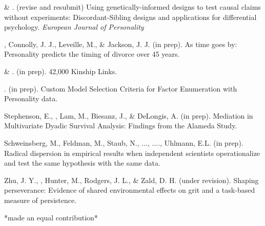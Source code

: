 
\item \meb \& \joe. (revise and resubmit) Using genetically-informed designs to test causal claims without experiments: Discordant-Sibling designs and applications for differential psychology. \textit{European Journal of Personality}  \href{https://osf.io/zpdwt/}{\color{blue}{https://osf.io/zpdwt/}}
\item\meb, Connolly, J. J., Leveille, M., \& Jackson, J. J. (in prep). As time goes by: Personality predicts the timing of divorce over 45 years.%
\item \meb \& \joe.  (in prep). 42,000 Kinship Links.
\item \meb. (in prep). Custom Model Selection Criteria for Factor Enumeration with Personality data.
\item Stephenson, E., \meb, Lam, M., Biesanz, J., \& DeLongis, A. (in prep). Mediation in Multivariate Dyadic Survival Analysis: Findings from the Alameda Study. %
\item Schweinsberg, M., Feldman, M., Staub, N., ..., \meb ...., Uhlmann, E.L. (in prep). Radical dispersion in empirical results when independent scientists operationalize and test the same hypothesis with the same data. 
\item Zhu, J. Y., \meb, Hunter, M., Rodgers, J. L., \& Zald, D. H. (under revision). Shaping perseverance: Evidence of shared environmental effects on grit and a task-based measure of persistence. %
\vspace{-2mm}\begin{center}\footnotesize{*made an equal contribution*}\end{center} \vspace{-3mm}
\vspace{-2mm}\begin{center}\end{center} \vspace{-4mm}
